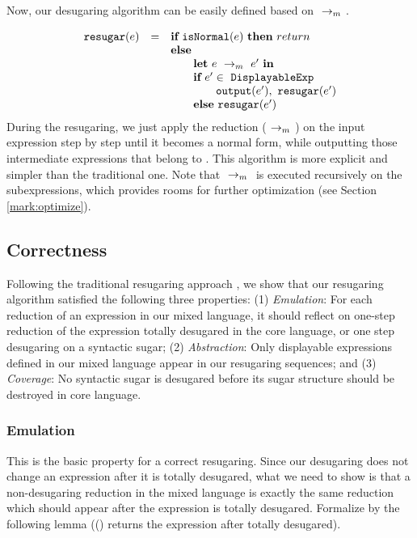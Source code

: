 
Now, our desugaring algorithm can be easily defined based on $~\rightarrow_m~$.

\[
\begin{array}{llll}
\mbox{\tt resugar} (e) &=& \mbox{\rm \bf if}~\mbox{\tt isNormal}(e)~\mbox{\rm \bf then}~return\\
              & & \mbox{\rm \bf else}~\\
							& & \qquad \mbox{\rm \bf let}~e ~\rightarrow_m~e'~\mbox{\rm \bf in}\\
							& & \qquad \mbox{\rm \bf if}~e' \in~\mbox{\tt DisplayableExp} \\
							& & \qquad \qquad \mbox{\tt output}(e'),~\mbox{\tt resugar}(e')\\
							& & \qquad \mbox{\rm \bf else}~\mbox{\tt resugar}(e')
\end{array}
\]
During the resugaring, we just apply the reduction ($~\rightarrow_m~$) on the input expression step by step until it becomes a normal form, while outputting those intermediate expressions that belong to . This algorithm is more explicit and simpler than the traditional one. Note that $~\rightarrow_m~$ is executed recursively on the subexpressions, which provides rooms for further optimization (see Section \ref{mark:optimize}).

\subsection{Correctness}
\label{mark:correct}

Following the traditional resugaring approach \cite{resugaring,hygienic}, we show that our resugaring algorithm satisfied the following three properties:
(1)
\emph{Emulation}: For each reduction of an expression in our mixed language, it should reflect on one-step reduction of the expression totally desugared in the core language, or one step desugaring on a syntactic sugar;
(2)
\emph{Abstraction}: Only displayable expressions defined in our mixed language appear in our resugaring sequences; and
(3)
\emph{Coverage}: No syntactic sugar is desugared before its sugar structure should be destroyed in core language.

\subsubsection{Emulation} This is the basic property for a correct resugaring. Since our desugaring does not change an expression after it is totally desugared, what we need to show is that a non-desugaring reduction in the mixed language is exactly the same  reduction which should appear after the expression is totally desugared. Formalize by the following lemma (() returns the expression after  totally desugared).

